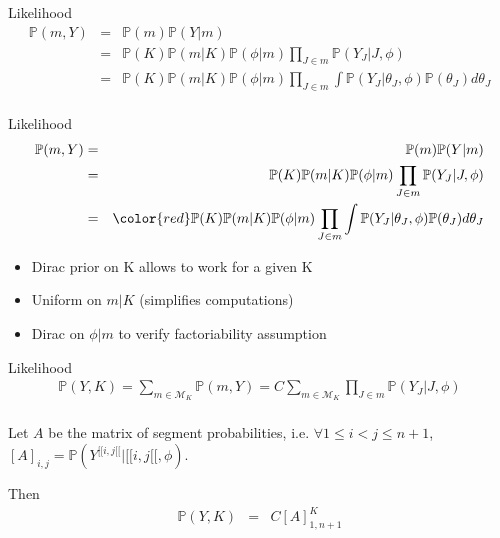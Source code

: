 \documentclass[a4paper]{beamer}
\newcommand{\PP}{\mathbb P}
\begin{document}
\begin{frame}{Likelihood}
  \begin{eqnarray*}
    \PP(m,Y) & = &  \PP(m) \PP(Y|m) \\
    & = & \PP(K)\PP(m|K)  \PP(\phi|m) \prod_{J \in m}  \PP(Y_J|J,\phi) \\
    & = & \PP(K)\PP(m|K)  \PP(\phi|m) \prod_{J \in m} \int \PP(Y_J|\theta_J,\phi) \PP(\theta_J)d\theta_J \\
  \end{eqnarray*}

\end{frame}

\begin{frame}{Likelihood}
  \begin{eqnarray*}
    \PP(m,Y) & = &  \PP(m) \PP(Y|m) \\
    & = & \PP(K)\PP(m|K)  \PP(\phi|m) \prod_{J \in m}  \PP(Y_J|J,\phi) \\
    & = & {\color{red}\PP(K)\PP(m|K)  \PP(\phi|m)} \prod_{J \in m} \int \PP(Y_J|\theta_J,\phi) \PP(\theta_J)d\theta_J \\
  \end{eqnarray*}

  \begin{itemize}
    \item Dirac prior on K allows to work for a given K
    \item Uniform on $m|K$ (simplifies computations)
    \item Dirac on $\phi|m$ to verify factoriability assumption
\end{itemize}
\end{frame}

\begin{frame}{Likelihood}
  \begin{eqnarray*}
    \PP(Y,K)=  \sum_{m\in \mathcal{M}_K}\PP(m,Y) = C \sum_{m\in \mathcal{M}_K} \prod_{J \in m}  \PP(Y_J|J,\phi) \\
  \end{eqnarray*}

Let $A$ be the matrix of segment probabilities, i.e. $\forall 1\leq i < j \leq n+1$,
$[A]_{i,j}= \PP(Y^{[\![i,j[\![}|[\![i,j[\![,\phi) $.

Then 
  \begin{eqnarray*}
    \PP(Y,K) & = &  C [A]^K_{1,n+1}
    \end{eqnarray*}
\end{frame}
\end{document}
